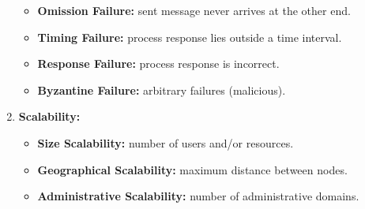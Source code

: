 \begin{enumerate}
\begin{itemize}
        \item \textbf{Omission Failure:} sent message never arrives at the other end.
        \item \textbf{Timing Failure:} process response lies outside a time interval.
        \item \textbf{Response Failure:} process response is incorrect.
        \item \textbf{Byzantine Failure:} arbitrary failures (malicious).
    \end{itemize}
    \item \textbf{Scalability:}
    \begin{itemize}
        \item \textbf{Size Scalability:} number of users and/or resources.
        \item \textbf{Geographical Scalability:} maximum distance between nodes.
        \item \textbf{Administrative Scalability:} number of administrative domains.
    \end{itemize}
\end{enumerate}
